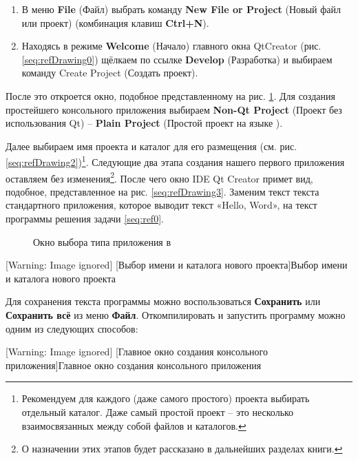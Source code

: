 \begin{enumerate}
\item В меню \textbf{File} (Файл) выбрать команду \textbf{New File or Project} (Новый файл или проект) (комбинация
клавиш \textbf{Ctrl+N}).
\item Находясь в режиме \textbf{Welcome} (Начало) главного окна QtCreator (рис. \ref{seq:refDrawing0}) щёлкаем по ссылке
\textbf{Develop} (Разработка) и выбираем команду Create Project (Создать проект).
\end{enumerate}
После это откроется окно, подобное представленному на рис. \ref{seq:refDrawing1}. Для создания простейшего консольного
приложения выбираем \textbf{Non-Qt Project} (Проект без использования Qt) – \textbf{Plain  Project} (Простой проект
на языке ).

Далее выбираем имя проекта и каталог для его размещения (см. рис. \ref{seq:refDrawing2})\footnote{Рекомендуем для
каждого (даже самого простого) проекта выбирать отдельный каталог. Даже самый простой проект – это несколько
взаимосвязанных между собой файлов и каталогов.}. Следующие два этапа создания нашего первого приложения оставляем без
изменения\footnote{О назначении этих этапов будет рассказано в дальнейших разделах книги.}. После чего окно IDE Qt
Creator примет вид, подобное, представленное на рис. \ref{seq:refDrawing3}. Заменим текст текста стандартного
приложения, которое выводит текст «Hello, Word», на текст программы решения задачи \ref{seq:ref0}.

\begin{figure}[htb]
\caption[Окно выбора типа приложения в ]{Окно выбора типа приложения в }
\label{seq:refDrawing1}

\end{figure}
 [Warning: Image ignored] %
[Выбор имени и каталога нового проекта]{Выбор имени и каталога нового проекта}
\label{seq:refDrawing2}


Для сохранения текста программы можно воспользоваться \textbf{Сохранить} или \textbf{Сохранить всё} из меню
\textbf{Файл}. Откомпилировать и запустить программу можно одним из следующих
способов:

 [Warning: Image ignored] %
[Главное окно создания консольного приложения]{Главное окно создания консольного приложения}
\label{seq:refDrawing3}


